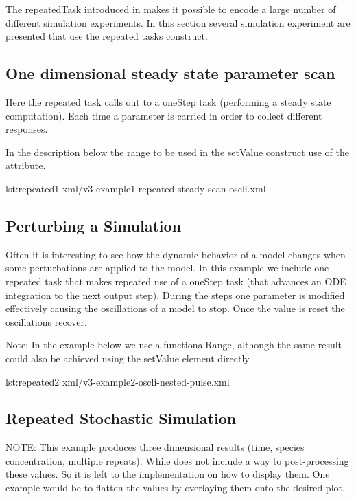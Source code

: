 The \hyperref[class:repeatedTask]{repeatedTask} introduced in \LoneVtwo makes it possible to encode a large number of different simulation experiments. In this section several simulation experiment are presented that use the repeated tasks construct. 

\subsection{One dimensional steady state parameter scan}
Here the repeated task calls out to a \hyperref[class:oneStep]{oneStep} task (performing a steady state computation). Each time a parameter is carried in order to collect different responses. 

In the description below the range to be used in the \hyperref[class:setValue]{setValue} construct use of the  attribute.

%
%

{lst:repeated1}
{xml/v3-example1-repeated-steady-scan-oscli.xml}

\subsection{Perturbing a Simulation}
Often it is interesting to see how the dynamic behavior of a model changes when some perturbations are applied to the model. In this example we include one repeated task that makes repeated use of a oneStep task (that advances an ODE integration to the next output step). During the steps one parameter is modified effectively causing the oscillations of a model to stop. Once the value is reset the oscillations recover. 

Note: In the example below we use a functionalRange, although the same result could also be achieved using the setValue element directly.

%
%

{lst:repeated2}
{xml/v3-example2-oscli-nested-pulse.xml}

\subsection{Repeated Stochastic Simulation}
NOTE: This example produces three dimensional results (time, species concentration, multiple repeats). While \LoneVtwo does not include a way to post-processing these values. So it is left to the implementation on how to display them. One example would be to flatten the values by overlaying them onto the desired plot. 

